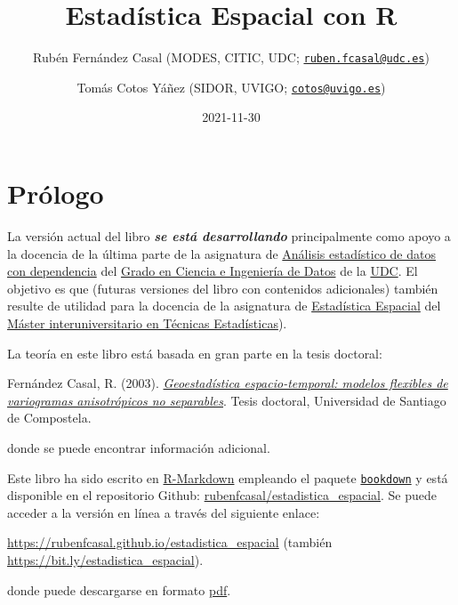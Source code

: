 \documentclass[
  spanish,
]{book}
\title{Estadística Espacial con R}
\author{Rubén Fernández Casal (MODES, CITIC, UDC; \href{mailto:ruben.fcasal@udc.es}{\nolinkurl{ruben.fcasal@udc.es}}) \and Tomás Cotos Yáñez (SIDOR, UVIGO; \href{mailto:cotos@uvigo.es}{\nolinkurl{cotos@uvigo.es}})}
\date{2021-11-30}
\theoremstyle{break}
\theoremstyle{definition}
\theoremstyle{definition}
\theoremstyle{definition}
\theoremstyle{definition}
\theoremstyle{remark}
\begin{document}
\maketitle

{
\setcounter{tocdepth}{1}
\tableofcontents
}
\hypertarget{pruxf3logo}{%
\chapter*{Prólogo}\label{pruxf3logo}}

La versión actual del libro \textbf{\emph{se está desarrollando}} principalmente como apoyo a la docencia de la última parte de la asignatura de \href{https://guiadocente.udc.es/guia_docent/index.php?centre=614\&ensenyament=614G02\&assignatura=614G02022\&idioma=cast}{Análisis estadístico de datos con dependencia} del \href{https://estudos.udc.es/es/study/start/614G02V01}{Grado en Ciencia e Ingeniería de Datos} de la \href{https://www.udc.es}{UDC}.
El objetivo es que (futuras versiones del libro con contenidos adicionales) también resulte de utilidad para la docencia de la asignatura de \href{http://eamo.usc.es/pub/mte/index.php?option=com_content\&view=article\&id=2202\&idm=15\&a\%C3\%B1o=2021}{Estadística Espacial} del \href{http://eio.usc.es/pub/mte}{Máster interuniversitario en Técnicas Estadísticas}).

La teoría en este libro está basada en gran parte en la tesis doctoral:

Fernández Casal, R. (2003). \href{https://rubenfcasal.github.io/files/Geoestadistica_espacio-temporal.pdf}{\emph{Geoestadística espacio-temporal: modelos flexibles de variogramas anisotrópicos no separables}}. Tesis doctoral, Universidad de Santiago de Compostela.

donde se puede encontrar información adicional.

Este libro ha sido escrito en \href{http://rmarkdown.rstudio.com}{R-Markdown} empleando el paquete \href{https://bookdown.org/yihui/bookdown/}{\texttt{bookdown}} y está disponible en el repositorio Github: \href{https://github.com/rubenfcasal/estadistica_espacial}{rubenfcasal/estadistica\_espacial}.
Se puede acceder a la versión en línea a través del siguiente enlace:

\url{https://rubenfcasal.github.io/estadistica_espacial} (también \url{https://bit.ly/estadistica_espacial}).

donde puede descargarse en formato \href{https://rubenfcasal.github.io/estadistica_espacial/estadistica_espacial.pdf}{pdf}.
\end{document}

